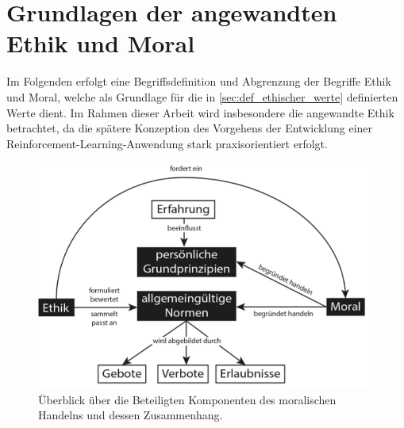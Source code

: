\chapter{Grundlagen der angewandten Ethik und Moral}\label{chap:grundlagen_ethik}
Im Folgenden erfolgt eine Begriffsdefinition und Abgrenzung der Begriffe Ethik und Moral, welche als Grundlage für die in \autoref{sec:def_ethischer_werte} definierten Werte dient.
Im Rahmen dieser Arbeit wird insbesondere die angewandte Ethik betrachtet, da die spätere Konzeption des Vorgehens der Entwicklung einer Reinforcement-Learning-Anwendung stark praxisorientiert erfolgt.

\begin{figure}[h]
    \centering
    \includegraphics{graphics/ethik_overview.png}
    \caption{Überblick über die Beteiligten Komponenten des moralischen Handelns und dessen Zusammenhang.}
    \label{fig:ethik}
\end{figure}

